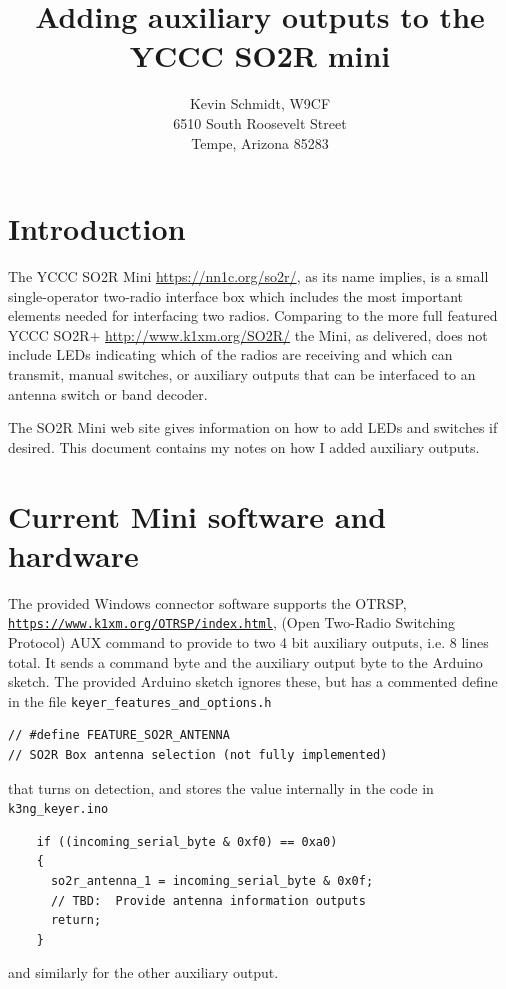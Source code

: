 \documentclass[12pt]{article}
\begin{document}
\title{
Adding auxiliary outputs to the YCCC SO2R mini
}
\author{
Kevin Schmidt, W9CF\\
6510 South Roosevelt Street\\
Tempe, Arizona 85283\\
}
\date{}
\maketitle

\section{Introduction}
The YCCC SO2R Mini
\href{https://nn1c.org/so2r/}{https://nn1c.org/so2r/},
as its name implies, is
a small single-operator two-radio interface box which includes the
most important elements needed for interfacing two radios.
Comparing to the more full featured YCCC SO2R+
\href{http://www.k1xm.org/SO2R/}{http://www.k1xm.org/SO2R/}
the Mini, as delivered, does not include LEDs indicating which of the radios
are receiving and which can transmit, manual switches, or auxiliary outputs
that can be interfaced to an antenna switch or band decoder.

The SO2R Mini web site gives information on how to add LEDs and switches
if desired. This document contains my notes on how I added auxiliary
outputs.

\section{Current Mini software and hardware}
The provided Windows connector software supports the OTRSP,
\href{https://www.k1xm.org/OTRSP/index.html}
{\nolinkurl{https://www.k1xm.org/OTRSP/index.html}},
(Open Two-Radio Switching Protocol)
AUX command to provide to two 4 bit auxiliary outputs, i.e. 8 lines total.
It sends a command byte and the auxiliary output byte to the Arduino sketch.
The provided Arduino sketch ignores these, but has a commented define
in the file \verb|keyer_features_and_options.h|
\begin{verbatim}
// #define FEATURE_SO2R_ANTENNA
// SO2R Box antenna selection (not fully implemented)
\end{verbatim}
that turns on detection, and stores the value internally in the code
in \verb|k3ng_keyer.ino|
\begin{verbatim}
    if ((incoming_serial_byte & 0xf0) == 0xa0)
    {
      so2r_antenna_1 = incoming_serial_byte & 0x0f;
      // TBD:  Provide antenna information outputs
      return;
    }
\end{verbatim}
and similarly for the other auxiliary output.
\end{document}
